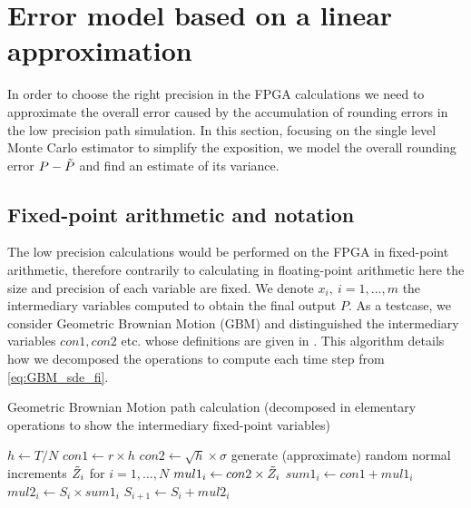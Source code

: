 \section{Error model based on a linear approximation} \label{sec:error_model}
In order to choose the right precision in the FPGA calculations we need to approximate the overall error caused by the accumulation of rounding errors in the low precision path simulation. In this section, focusing on the single level Monte Carlo estimator to simplify the exposition, we model the overall rounding error $P-\Tilde{P}$ and find an estimate of its variance.


\subsection{Fixed-point arithmetic and notation}
The low precision calculations would be performed on the FPGA in fixed-point arithmetic, therefore contrarily to calculating in floating-point arithmetic here the size and precision of each variable are fixed. We denote $x_i, \: i=1, \ldots, m$ the intermediary variables computed to obtain the final output $P$. As a testcase, we consider Geometric Brownian Motion (GBM) and distinguished the intermediary variables $con1, con2$ etc. whose definitions are given in . This algorithm details how we decomposed the operations to compute each time step from \eqref{eq:GBM_sde_fi}.

\begin{algorithm}[h]
\caption{Geometric Brownian Motion path calculation (decomposed in elementary operations to show the intermediary fixed-point variables)}\label{alg:GMB_code_forward}
\begin{algorithmic}
\STATE $h \gets T/N$
\STATE $con1 \gets r \times h$
\STATE $con2 \gets \sqrt{h} \times \sigma$
\STATE generate (approximate) random normal increments $\Tilde{Z}_i$ for $i=1, \ldots, N$ %
\STATE $mul1_i \gets con2 \times \Tilde{Z}_i$
\STATE $sum1_i \gets con1 + mul1_i$
\STATE $mul2_i \gets S_i \times sum1_i$
\STATE $S_{i+1} \gets S_i + mul2_i$
\ENDFOR
\end{algorithmic}
\end{algorithm}

